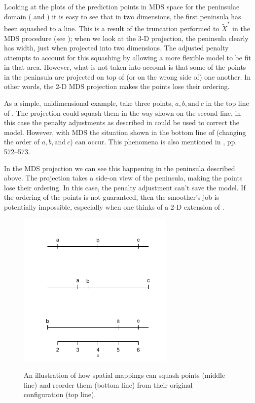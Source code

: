 {Looking at the plots of the prediction points in MDS space for the peninsulae domain ( and ) it is easy to see that in two dimensions, the first peninsula has been squashed to a line. This is a result of the truncation performed to $\tilde{X}^*$ in the MDS procedure (see ); when we look at the 3-D projection, the peninsula clearly has width, just when projected into two dimensions. The adjusted penalty attempts to account for this squashing by allowing a more flexible model to be fit in that area. However, what is not taken into account is that some of the points in the peninsula are projected on top of (or on the wrong side of) one another. In other words, the 2-D MDS projection makes the points lose their ordering. 

As a simple, unidimensional example, take three points, $a, b, \text{and}\ c$ in the top line of . The projection could squash them in the way shown on the second line, in this case the penalty adjustments as described in \cite{wood2000} could be used to correct the model. However, with MDS the situation shown in the bottom line of  (changing the order of $a, b, \text{and}\ c$) can occur. This phenomena is also mentioned in \cite{elements}, pp. 572--573.

In the MDS projection we can see this happening in the peninsula described above. The projection takes a side-on view of the peninsula, making the points lose their ordering. In this case, the penalty adjustment can't save the model. If the ordering of the points is not guaranteed, then the smoother's job is potentially impossible, especially when one thinks of a 2-D extension of .

\begin{figure}
\centering
\includegraphics[width=3in]{mds/figs/linedia.pdf} \\
\caption{An illustration of how spatial mappings can squash points (middle line) and reorder them (bottom line) from their original configuration (top line).}
\label{linedia}
\end{figure}

}
